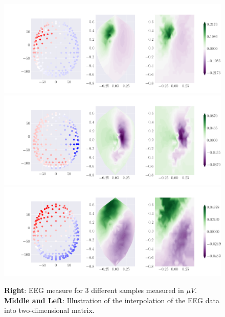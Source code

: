 \documentclass[a4paper, UKenglish, 11pt]{uiomaster}
\begin{document}
\begin{figure}[!htb]
\centering
\includegraphics[width=\linewidth]{../Code/plots/CNN/new_eeg_dipole_pos_0.png}
\includegraphics[width=\linewidth]{../Code/plots/CNN/new_eeg_dipole_pos_4.png}
\includegraphics[width=\linewidth]{../Code/plots/CNN/new_eeg_dipole_pos_6.png}

\caption{\newline
\textbf{Right}: EEG measure for 3 different samples measured in $\mu V$. \newline
\textbf{Middle and Left}: Illustration of the interpolation of the EEG data into two-dimensional matrix.}
\label{fig:eeg_dipole_pos_0}

\end{figure}
\end{document}
